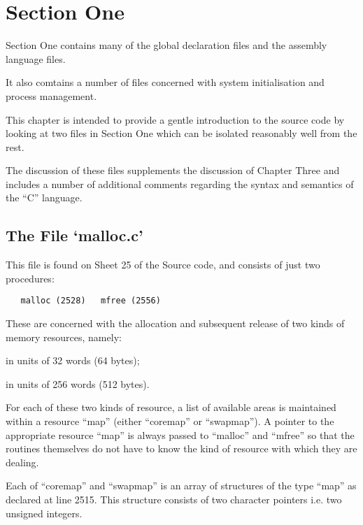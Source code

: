%
%
\section*{Section One}

{\sf Section One contains many of the global declaration
files and the assembly language files.

It also comtains a number of files concerned with
system initialisation and process management.}



This chapter is intended to provide a
gentle introduction to the source code
by looking at two files in Section One
which can be isolated reasonably well
from the rest.


The discussion of these files supplements the discussion of Chapter Three
and includes a number of additional
comments regarding the syntax and
semantics of the ``C'' language.


\subsection{The File `malloc.c'}

This file is found on Sheet 25 of the
Source code, and consists of just two
procedures:

\begin{verbatim}
   malloc (2528)   mfree (2556)
\end{verbatim}


These are concerned with the allocation
and subsequent release of two kinds of
memory resources, namely:

\bd
\item[main memory] in units of 32 words (64 bytes);

\item[disk swap area] in units of 256 words (512 bytes).
\ed

For each of these two kinds of
resource, a list of available areas is
maintained within a resource ``map''
(either ``coremap'' or ``swapmap''). A
pointer to the appropriate resource
``map'' is always passed to ``malloc'' and
``mfree'' so that the routines themselves
do not have to know the kind of
resource with which they are dealing.

Each of ``coremap'' and ``swapmap'' is an
array of structures of the type ``map''
as declared at line 2515. This structure consists of two character pointers
i.e. two unsigned integers.

